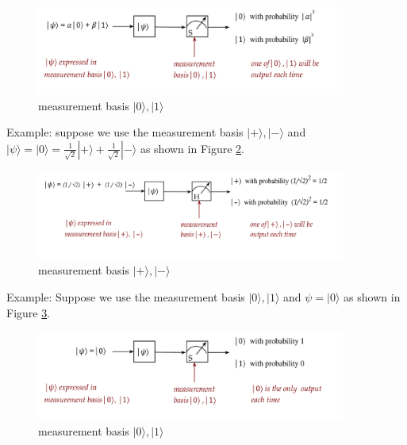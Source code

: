 \documentclass[main.tex]{subfiles}
\begin{document}
    \begin{figure}
        \centering
        \includegraphics[width=4in]{notes/figs/n05/09qubit3.png}
        \caption{measurement basis $|0\rangle,|1\rangle$}
        \label{fig:09qubit3}
    \end{figure}
    
    Example: suppose we use the measurement basis $|+\rangle,|-\rangle$ and $|\psi\rangle=|0\rangle=\frac{1}{\sqrt{2}}|+\rangle+\frac{1}{\sqrt{2}}|-\rangle$ as shown in Figure \ref{fig:10qubit4}.
    
    \begin{figure}
        \centering
        \includegraphics[width=4in]{notes/figs/n05/10qubit4.png}
        \caption{measurement basis $|+\rangle,|-\rangle$}
        \label{fig:10qubit4}
    \end{figure}
    
    Example: Suppose we use the measurement basis $|0\rangle,|1\rangle$ and $\psi=|0\rangle$ as shown in Figure \ref{fig:11qubit5}.
    
    \begin{figure}
        \centering
        \includegraphics[width=4in]{notes/figs/n05/11qubit5.png}
        \caption{measurement basis $|0\rangle,|1\rangle$ }
        \label{fig:11qubit5}
    \end{figure}
    
\end{document}
